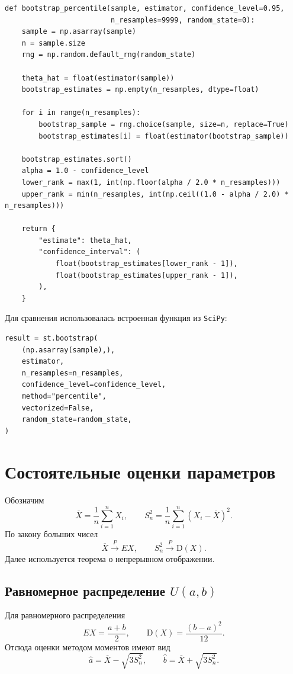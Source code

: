 \documentclass[a4paper,14pt]{extarticle}
\begin{document}
\begin{lstlisting}
def bootstrap_percentile(sample, estimator, confidence_level=0.95,
                         n_resamples=9999, random_state=0):
    sample = np.asarray(sample)
    n = sample.size
    rng = np.random.default_rng(random_state)

    theta_hat = float(estimator(sample))
    bootstrap_estimates = np.empty(n_resamples, dtype=float)

    for i in range(n_resamples):
        bootstrap_sample = rng.choice(sample, size=n, replace=True)
        bootstrap_estimates[i] = float(estimator(bootstrap_sample))

    bootstrap_estimates.sort()
    alpha = 1.0 - confidence_level
    lower_rank = max(1, int(np.floor(alpha / 2.0 * n_resamples)))
    upper_rank = min(n_resamples, int(np.ceil((1.0 - alpha / 2.0) * n_resamples)))

    return {
        "estimate": theta_hat,
        "confidence_interval": (
            float(bootstrap_estimates[lower_rank - 1]),
            float(bootstrap_estimates[upper_rank - 1]),
        ),
    }
\end{lstlisting}

Для сравнения использовалась встроенная функция из \texttt{SciPy}:

\begin{lstlisting}
result = st.bootstrap(
    (np.asarray(sample),),
    estimator,
    n_resamples=n_resamples,
    confidence_level=confidence_level,
    method="percentile",
    vectorized=False,
    random_state=random_state,
)
\end{lstlisting}

\section{Состоятельные оценки параметров}

Обозначим
\[
\overline{X} = \frac{1}{n}\sum_{i=1}^{n}X_i,
\qquad
S_n^2 = \frac{1}{n}\sum_{i=1}^{n}(X_i-\overline{X})^2.
\]
По закону больших чисел
\[
\overline{X} \xrightarrow{P} EX,
\qquad
S_n^2 \xrightarrow{P} \mathrm{D}(X).
\]
Далее используется теорема о непрерывном отображении.

\subsection[Равномерное распределение U(a,b)]{Равномерное распределение \(U(a,b)\)}

Для равномерного распределения
\[
EX = \frac{a+b}{2},
\qquad
\mathrm{D}(X)=\frac{(b-a)^2}{12}.
\]
Отсюда оценки методом моментов имеют вид
\[
\widehat{a} = \overline{X} - \sqrt{3S_n^2},
\qquad
\widehat{b} = \overline{X} + \sqrt{3S_n^2}.
\]
\end{document}
